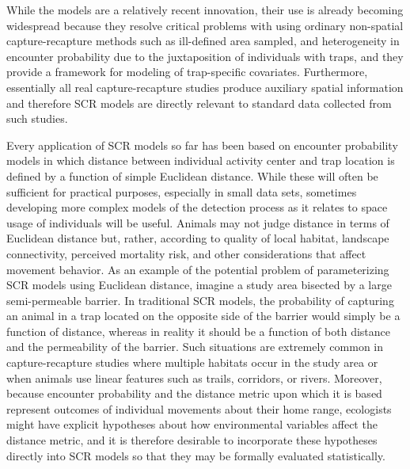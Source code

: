 \documentclass[12pt]{article}
\begin{document}
\begin{spacing}{1.8}
While the models are a relatively recent innovation, their use is
already becoming widespread \citep{efford_etal:2009ecol,
  gardner_etal:2010jwm, gardner_etal:2010ecol,kery_etal:2010, 
  gopalaswamy_etal:2012, foster_harmsen:2012} because they resolve
critical problems with using ordinary non-spatial capture-recapture
methods such as ill-defined area sampled, and heterogeneity in
encounter probability due to the juxtaposition of individuals with
traps, and they provide a framework for modeling of trap-specific
covariates.  Furthermore, essentially all real capture-recapture
studies produce auxiliary spatial information and therefore SCR models
are directly relevant to standard data collected from such studies.

Every application of SCR models so far has been based on encounter
probability models in which distance between individual activity
center and trap location is defined by a function of simple Euclidean
distance.  While these will often be sufficient for practical
purposes, especially in small data sets, sometimes developing more
complex models of the detection process as it relates to space usage
of individuals will be useful.  Animals may not judge distance in
terms of Euclidean distance but, rather, according to quality of local
habitat, landscape connectivity, perceived mortality risk, and other
considerations that affect movement behavior.
As an example of the potential problem of parameterizing SCR models
using Euclidean distance, imagine a study area bisected by a large
semi-permeable barrier. In traditional SCR models, the probability of
capturing an animal in a trap located on the opposite side of the
barrier would simply be a function of distance, whereas in reality it
should be a function of both distance and the permeability of the
barrier. Such situations are extremely common in capture-recapture
studies where multiple habitats occur in the study area or when
animals use linear features such as trails, corridors, or rivers.
 Moreover, because encounter probability and the distance
metric upon which it is based represent outcomes of individual
movements about their home range, ecologists might have explicit
hypotheses about how environmental variables affect the distance
metric, and it is therefore desirable to incorporate these hypotheses
directly into SCR models so that they may be formally evaluated
statistically.


\end{spacing}
\end{document}
